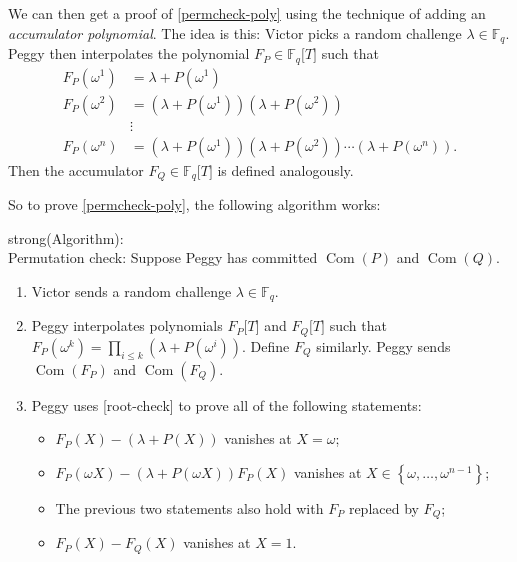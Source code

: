 We can then get a proof of
\hyperref[permcheck-poly]{{[}permcheck-poly{]}} using the technique of
adding an \emph{accumulator polynomial}. The idea is this: Victor picks
a random challenge \(\lambda \in {\mathbb{F}}_{q}\). Peggy then
interpolates the polynomial
\(F_{P} \in {\mathbb{F}}_{q}\lbrack T\rbrack\) such that
\[\begin{aligned}
F_{P}\left( \omega^{1} \right) & = \lambda + P\left( \omega^{1} \right) \\
F_{P}\left( \omega^{2} \right) & = \left( \lambda + P\left( \omega^{1} \right) \right)\left( \lambda + P\left( \omega^{2} \right) \right) \\
 & \vdots \\
F_{P}\left( \omega^{n} \right) & = \left( \lambda + P\left( \omega^{1} \right) \right)\left( \lambda + P\left( \omega^{2} \right) \right)\cdots\left( \lambda + P\left( \omega^{n} \right) \right).
\end{aligned}\] Then the accumulator
\(F_{Q} \in {\mathbb{F}}_{q}\lbrack T\rbrack\) is defined analogously.

So to prove \hyperref[permcheck-poly]{{[}permcheck-poly{]}}, the
following algorithm works:

strong(Algorithm):\\
Permutation check: Suppose Peggy has committed \(\operatorname{Com}(P)\)
and \(\operatorname{Com}(Q)\).

\begin{enumerate}
\item
  Victor sends a random challenge \(\lambda \in {\mathbb{F}}_{q}\).
\item
  Peggy interpolates polynomials \(F_{P}\lbrack T\rbrack\) and
  \(F_{Q}\lbrack T\rbrack\) such that
  \(F_{P}\left( \omega^{k} \right) = \prod_{i \leq k}\left( \lambda + P\left( \omega^{i} \right) \right)\).
  Define \(F_{Q}\) similarly. Peggy sends \(\operatorname{Com}(F_{P})\)
  and \(\operatorname{Com}(F_{Q})\).
\item
  Peggy uses {[}root-check{]} to prove all of the following statements:

  \begin{itemize}
  \item
    \(F_{P}(X) - \left( \lambda + P(X) \right)\) vanishes at
    \(X = \omega\);
  \item
    \(F_{P}(\omega X) - \left( \lambda + P(\omega X) \right)F_{P}(X)\)
    vanishes at \(X \in \left\{ \omega,\ldots,\omega^{n - 1} \right\}\);
  \item
    The previous two statements also hold with \(F_{P}\) replaced by
    \(F_{Q}\);
  \item
    \(F_{P}(X) - F_{Q}(X)\) vanishes at \(X = 1\).
  \end{itemize}
\end{enumerate}

